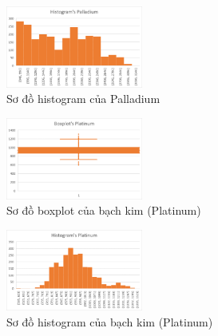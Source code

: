 \begin{figure}[H]
\centerline{\includegraphics[width=0.4\textwidth]{img/Picture6.png}}
\caption{Sơ đồ histogram của Palladium}
\label{fig}
\end{figure}

\begin{figure}[H]
\centerline{\includegraphics[width=0.4\textwidth]{img/Picture4.png}}
\caption{Sơ đồ boxplot của bạch kim (Platinum)}
\label{fig}
\end{figure}

\begin{figure}[H]
\centerline{\includegraphics[width=0.4\textwidth]{img/Picture7.png}}
\caption{Sơ đồ histogram của bạch kim (Platinum)}
\label{fit}
\end{figure}
